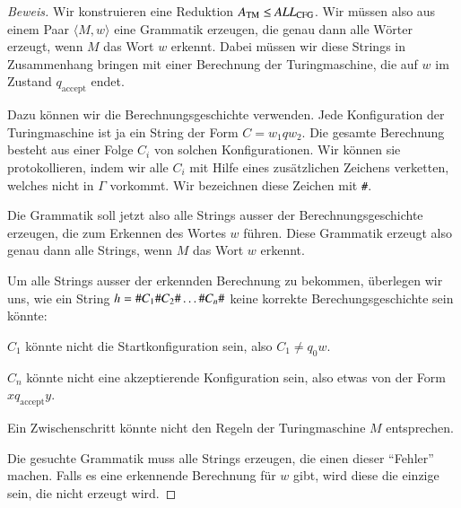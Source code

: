 \begin{proof}[Beweis]
Wir konstruieren eine Reduktion 
$A_{\text{TM}}\le \text{\it ALL}_{\text{CFG}}$.
Wir müssen also aus einem Paar $\langle M,w\rangle$ eine
Grammatik erzeugen, die genau dann alle Wörter erzeugt, wenn
$M$ das Wort $w$ erkennt.
Dabei müssen wir diese Strings in
Zusammenhang bringen mit einer Berechnung der Turingmaschine, die
auf $w$ im Zustand $q_{\text{accept}}$ endet.

Dazu können wir
die Berechnungsgeschichte verwenden.
Jede Konfiguration der
Turingmaschine ist ja ein String der Form $C=w_1qw_2$.
Die gesamte
Berechnung besteht aus einer Folge $C_i$ von solchen Konfigurationen.
Wir können sie protokollieren, indem wir alle $C_i$
mit Hilfe eines zusätzlichen Zeichens verketten,
welches nicht in $\Gamma$ vorkommt.
Wir bezeichnen diese Zeichen
mit {\tt\#}.

Die Grammatik soll jetzt also alle Strings ausser der Berechnungsgeschichte
erzeugen, die zum Erkennen des Wortes $w$ führen.
Diese Grammatik
erzeugt also genau dann alle Strings, wenn $M$ das Wort $w$ erkennt.

Um alle Strings ausser der erkennden Berechnung zu bekommen,
überlegen wir uns, wie ein String
$h={\tt\#}C_1{\tt\#}C_2{\tt\#}\dots{\tt\#}C_n{\tt\#}$
keine korrekte Berechungsgeschichte sein könnte:
\medskip
\begin{compactenum}
\item $C_1$ könnte nicht die Startkonfiguration sein, also
$C_1\ne q_0w$.
\item $C_n$ könnte nicht eine akzeptierende Konfiguration 
sein, also etwas von der Form $xq_{\text{accept}}y$.
\item Ein Zwischenschritt könnte nicht den Regeln der Turingmaschine
$M$ entsprechen.
\end{compactenum}
\medskip
Die gesuchte Grammatik muss alle Strings erzeugen, die einen dieser ``Fehler''
machen.
Falls es eine erkennende Berechnung für $w$ gibt, wird diese
die einzige sein, die nicht erzeugt wird.


\end{proof}
